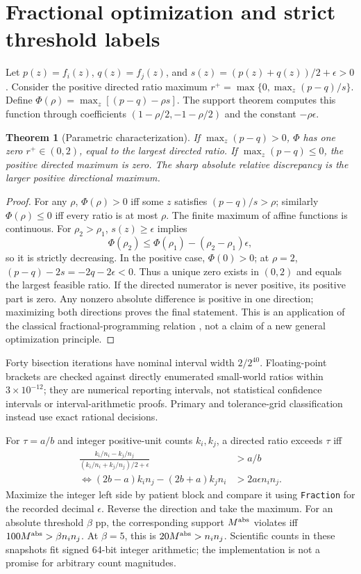 \documentclass[10pt,letterpaper]{article}
\newtheorem{theorem}{Theorem}
\begin{document}
\section{Fractional optimization and strict threshold labels}
Let $p(z)=f_i(z)$, $q(z)=f_j(z)$, and $s(z)=(p(z)+q(z))/2+\epsilon>0$. Consider the positive directed ratio maximum $r^+=\max\{0,\max_z(p-q)/s\}$. Define $\Phi(\rho)=\max_z[(p-q)-\rho s]$. The support theorem computes this function through coefficients $(1-\rho/2,-1-\rho/2)$ and the constant $-\rho\epsilon$.

\begin{theorem}[Parametric characterization]
If $\max_z(p-q)>0$, $\Phi$ has one zero $r^+\in(0,2)$, equal to the largest directed ratio. If $\max_z(p-q)\leq0$, the positive directed maximum is zero. The sharp absolute relative discrepancy is the larger positive directional maximum.
\end{theorem}
\begin{proof}
For any $\rho$, $\Phi(\rho)>0$ iff some $z$ satisfies $(p-q)/s>\rho$; similarly $\Phi(\rho)\leq0$ iff every ratio is at most $\rho$. The finite maximum of affine functions is continuous. For $\rho_2>\rho_1$, $s(z)\geq\epsilon$ implies
\[
 \Phi(\rho_2)\leq\Phi(\rho_1)-(\rho_2-\rho_1)\epsilon,
\]
so it is strictly decreasing. In the positive case, $\Phi(0)>0$; at $\rho=2$, $(p-q)-2s=-2q-2\epsilon<0$. Thus a unique zero exists in $(0,2)$ and equals the largest feasible ratio. If the directed numerator is never positive, its positive part is zero. Any nonzero absolute difference is positive in one direction; maximizing both directions proves the final statement. This is an application of the classical fractional-programming relation \cite{dinkelbach}, not a claim of a new general optimization principle.
\end{proof}

Forty bisection iterations have nominal interval width $2/2^{40}$. Floating-point brackets are checked against directly enumerated small-world ratios within $3\times10^{-12}$; they are numerical reporting intervals, not statistical confidence intervals or interval-arithmetic proofs. Primary and tolerance-grid classification instead use exact rational decisions.

For $\tau=a/b$ and integer positive-unit counts $k_i,k_j$, a directed ratio exceeds $\tau$ iff
\begin{align}
 \frac{k_i/n_i-k_j/n_j}{(k_i/n_i+k_j/n_j)/2+\epsilon}&>a/b\\
 \iff (2b-a)k_i n_j-(2b+a)k_j n_i&>2a\epsilon n_i n_j.
\end{align}
Maximize the integer left side by patient block and compare it using \texttt{Fraction} for the recorded decimal $\epsilon$. Reverse the direction and take the maximum. For an absolute threshold $\beta$ pp, the corresponding support $M^{\rm abs}$ violates iff $100M^{\rm abs}>\beta n_i n_j$. At $\beta=5$, this is $20M^{\rm abs}>n_i n_j$. Scientific counts in these snapshots fit signed 64-bit integer arithmetic; the implementation is not a promise for arbitrary count magnitudes.
\end{document}
